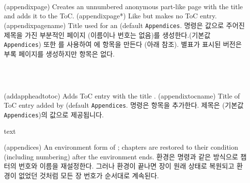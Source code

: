 \begin{syntax}
\cmd{\appendixpage}\\
\cmd{\appendixpage*}\\
\cmd{\appendixpagename}\\
\end{syntax}
\glossary(appendixpage)
  {}%
  {Creates an unnumbered anonymous  part-like page with the title  and adds it to the ToC.}
\glossary(appendixpage*)
  {}%
  {Like  but makes no ToC entry.}
\glossary(appendixpagename)
  {}%
  {Title used for an  (default \texttt{Appendices}.}
\cmd{\appendixpage} 명령은 \cmd{\appendixpagename} 값으로 주어진 제목을 가진 부분적인 페이지 (이름이나 번호는 없음)를 생성한다.(기본값 \texttt{Appendices})
또한 \cmd{\addappheadtotoc}를 사용하여 \toc{}에 항목을 만든다 (아래 참조). 별표가 표시된 버전은 부록 페이지를 생성하지만 \toc{} 항목은 없다.

\begin{syntax}
\cmd{\addappheadtotoc}\\
\cmd{\appendixtocname}\\
\end{syntax}
\glossary(addappheadtotoc)%
  {}%
  {Adds ToC entry with the title .}
\glossary(appendixtocname)%
  {}%
  {Title of ToC entry added by  (default \texttt{Appendices}.}
\cmd{\addappheadtotoc} 명령은  항목을 추가한다.
제목은 \cmd{\appendixtocname} (기본값 \texttt{Appendices})의 값으로 제공됩니다.
\begin{syntax}
 text \\
\end{syntax}
\glossary(appendices)%
  {}%
  {An environment form of ; chapters are restored to their condition
   (including numbering) after the environment ends.}
 환경은 \cmd{\appendix} 명령과 같은 방식으로 챕터의 번호와 이름을 재설정한다.
그러나 환경이 끝나면 장이 원래 상태로 복원되고  환경이 없었던 것처럼 모든 장 번호가 순서대로 계속된다.

